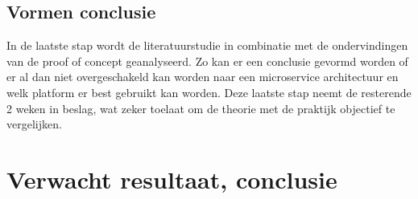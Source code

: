 \subsection{Vormen conclusie}
In de laatste stap wordt de literatuurstudie in combinatie met de ondervindingen van de proof of concept geanalyseerd. Zo kan er een conclusie gevormd worden of er al dan niet overgeschakeld kan worden naar een microservice architectuur en welk platform er best gebruikt kan worden. Deze laatste stap neemt de resterende 2 weken in beslag, wat zeker toelaat om de theorie met de praktijk objectief te vergelijken.
%
%
%
%
%

\section{Verwacht resultaat, conclusie}%
\label{sec:verwachte_resultaten}
